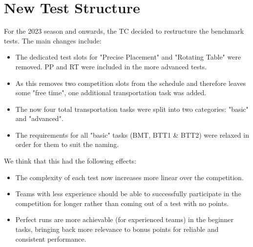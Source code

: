 

\section{New Test Structure}
\label{sec:New Test Structure}

For the 2023 season and onwards, the TC decided to restructure the benchmark tests.
The main changes include:

\begin{itemize}
\item The dedicated test slots for "Precise Placement" and "Rotating Table" were removed. 
PP and RT were included in the more advanced tests.
\item As this removes two competition slots from the schedule and therefore leaves some "free time", one additional transportation task was added.
\item The now four total transportation tasks were split into two categories: "basic" and "advanced".
\item The requirements for all "basic" tasks (BMT, BTT1 \& BTT2) were relaxed in order for them to suit the naming.
\end{itemize}

We think that this had the following effects:

\begin{itemize}
\item The complexity of each test now increases more linear over the competition.
\item Teams with less experience should be able to successfully participate in the competition for longer rather than coming out of a test with no points.
\item Perfect runs are more achievable (for experienced teams) in the beginner tasks,
 bringing back more relevance to bonus points for reliable and consistent performance.
\end{itemize}

